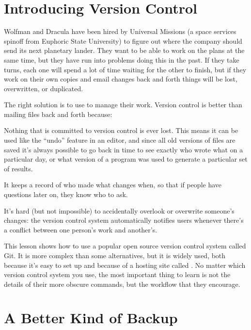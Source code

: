 \documentclass{book}
\begin{document}
\section{Introducing Version Control}

Wolfman and Dracula have been hired by Universal Missions (a space
services spinoff from Euphoric State University) to figure out where the
company should send its next planetary lander. They want to be able to
work on the plans at the same time, but they have run into problems
doing this in the past. If they take turns, each one will spend a lot of
time waiting for the other to finish, but if they work on their own
copies and email changes back and forth things will be lost,
overwritten, or duplicated.

The right solution is to use  to manage their work. Version control is better than mailing
files back and forth because:

\begin{swcitemize}
\item
  Nothing that is committed to version control is ever lost. This means
  it can be used like the ``undo'' feature in an editor, and since all
  old versions of files are saved it's always possible to go back in
  time to see exactly who wrote what on a particular day, or what
  version of a program was used to generate a particular set of results.
\item
  It keeps a record of who made what changes when, so that if people
  have questions later on, they know who to ask.
\item
  It's hard (but not impossible) to accidentally overlook or overwrite
  someone's changes: the version control system automatically notifies
  users whenever there's a conflict between one person's work and
  another's.
\end{swcitemize}

This lesson shows how to use a popular open source version control
system called Git. It is more complex than some alternatives, but it is
widely used, both because it's easy to set up and because of a hosting
site called . No matter which version
control system you use, the most important thing to learn is not the
details of their more obscure commands, but the workflow that they
encourage.

\section{A Better Kind of Backup}
\end{document}
